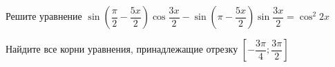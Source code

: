 \begin{ex}
	\begin{condition}
		\begin{enumcols}[label=\asbuk*)]
			\item Решите уравнение \( \sin{\left(\dfrac{\pi}{2}-  \dfrac{5x}{2}\right)}\cos{\dfrac{3x}{2}} - \sin{\left(\pi-  \dfrac{5x}{2}\right)}\sin{\dfrac{3x}{2}}= \cos^2 2x  \)
			\item Найдите все корни уравнения, принадлежащие отрезку \( \left[-\dfrac{3\pi}{4};\dfrac{3\pi}{2}\right]  \)
		\end{enumcols}
	\end{condition}
\end{ex}